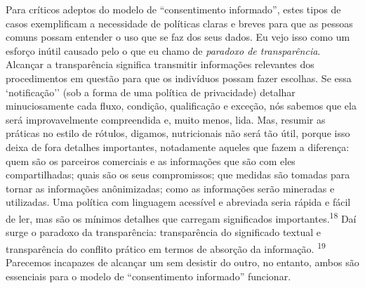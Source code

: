Para críticos adeptos do modelo de ``consentimento informado'', estes
tipos de casos exemplificam a necessidade de políticas claras e breves
para que as pessoas comuns possam entender o uso que se faz dos seus
dados. Eu vejo isso como um esforço inútil causado pelo o que eu chamo
de \emph{paradoxo de transparência}. Alcançar a transparência significa
transmitir informações relevantes dos procedimentos em questão para que
os indivíduos possam fazer escolhas. Se essa `notificação'' (sob a forma
de uma política de privacidade) detalhar minuciosamente cada fluxo,
condição, qualificação e exceção, nós sabemos que ela será
improvavelmente compreendida e, muito menos, lida. Mas, resumir as
práticas no estilo de rótulos, digamos, nutricionais não será tão útil,
porque isso deixa de fora detalhes importantes, notadamente aqueles que
fazem a diferença: quem são os parceiros comerciais e as informações que
são com eles compartilhadas; quais são os seus compromissos; que medidas
são tomadas para tornar as informações anônimizadas; como as informações
serão mineradas e utilizadas. Uma política com linguagem acessível e
abreviada seria rápida e fácil de ler, mas são os mínimos detalhes que
carregam significados importantes.\textsuperscript{{18}} Daí surge o
paradoxo da transparência: transparência do significado textual e
transparência do conflito prático em termos de absorção da informação.
\textsuperscript{{19}} Parecemos incapazes de alcançar um sem desistir
do outro, no entanto, ambos são essenciais para o modelo de
``consentimento informado'' funcionar.

